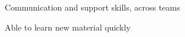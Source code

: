 \begin{plainlist}
	\item Communication and support skills, across teams
	\item Able to learn new material quickly
\end{plainlist}

